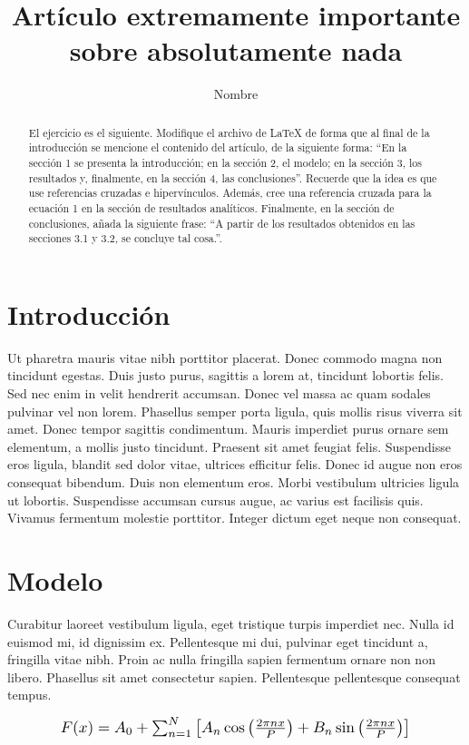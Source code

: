 \documentclass[11pt, twocolumn]{article}
\title{Artículo extremamente importante sobre absolutamente nada}
\author{Nombre}
\date{}
\begin{document}
    \maketitle
    \begin{abstract}
        El ejercicio es el siguiente. Modifique el archivo de \LaTeX{} de forma que al final de la introducción se mencione el contenido del artículo, de la siguiente forma: ``En la sección 1 se presenta la introducción; en la sección 2, el modelo; en la sección 3, los resultados y, finalmente, en la sección 4, las conclusiones''. Recuerde que la idea es que use referencias cruzadas e hipervínculos. Además, cree una referencia cruzada para la ecuación 1 en la sección de resultados analíticos. Finalmente, en la sección de conclusiones, añada la siguiente frase: ``A partir de los resultados obtenidos en las secciones 3.1 y 3.2, se concluye tal cosa.''.
    \end{abstract}

    \section{Introducción}
    Ut pharetra mauris vitae nibh porttitor placerat. Donec commodo magna non tincidunt egestas. Duis justo purus, sagittis a lorem at, tincidunt lobortis felis. Sed nec enim in velit hendrerit accumsan. Donec vel massa ac quam sodales pulvinar vel non lorem. Phasellus semper porta ligula, quis mollis risus viverra sit amet. Donec tempor sagittis condimentum. Mauris imperdiet purus ornare sem elementum, a mollis justo tincidunt. Praesent sit amet feugiat felis. Suspendisse eros ligula, blandit sed dolor vitae, ultrices efficitur felis. Donec id augue non eros consequat bibendum. Duis non elementum eros. Morbi vestibulum ultricies ligula ut lobortis. Suspendisse accumsan cursus augue, ac varius est facilisis quis. Vivamus fermentum molestie porttitor. Integer dictum eget neque non consequat.

    \section{Modelo}
    Curabitur laoreet vestibulum ligula, eget tristique turpis imperdiet nec. Nulla id euismod mi, id dignissim ex. Pellentesque mi dui, pulvinar eget tincidunt a, fringilla vitae nibh. Proin ac nulla fringilla sapien fermentum ornare non non libero. Phasellus sit amet consectetur sapien. Pellentesque pellentesque consequat tempus. 

    \begin{equation}
    \resizebox{0.8\columnwidth}{!} {$F(x) = A_0 + \sum_{n=1}^{N} \left[A_n \cos\left(\frac{2\pi nx}{P}\right) + B_n \sin\left(\frac{2\pi nx}{P}\right)\right]$}
    \end{equation}
    
\end{document}
